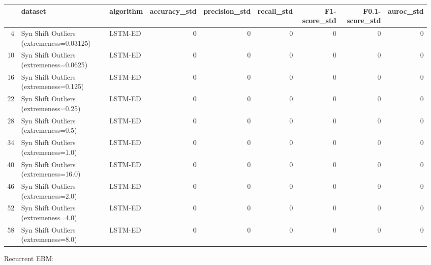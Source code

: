 \begin{tabular}{rllrrrrrr}
\hline
    & dataset                                  & algorithm   &   accuracy\_std &   precision\_std &   recall\_std &   F1-score\_std &   F0.1-score\_std &   auroc\_std \\
\hline
  4 & Syn Shift Outliers (extremeness=0.03125) & LSTM-ED     &              0 &               0 &            0 &              0 &                0 &           0 \\
 10 & Syn Shift Outliers (extremeness=0.0625)  & LSTM-ED     &              0 &               0 &            0 &              0 &                0 &           0 \\
 16 & Syn Shift Outliers (extremeness=0.125)   & LSTM-ED     &              0 &               0 &            0 &              0 &                0 &           0 \\
 22 & Syn Shift Outliers (extremeness=0.25)    & LSTM-ED     &              0 &               0 &            0 &              0 &                0 &           0 \\
 28 & Syn Shift Outliers (extremeness=0.5)     & LSTM-ED     &              0 &               0 &            0 &              0 &                0 &           0 \\
 34 & Syn Shift Outliers (extremeness=1.0)     & LSTM-ED     &              0 &               0 &            0 &              0 &                0 &           0 \\
 40 & Syn Shift Outliers (extremeness=16.0)    & LSTM-ED     &              0 &               0 &            0 &              0 &                0 &           0 \\
 46 & Syn Shift Outliers (extremeness=2.0)     & LSTM-ED     &              0 &               0 &            0 &              0 &                0 &           0 \\
 52 & Syn Shift Outliers (extremeness=4.0)     & LSTM-ED     &              0 &               0 &            0 &              0 &                0 &           0 \\
 58 & Syn Shift Outliers (extremeness=8.0)     & LSTM-ED     &              0 &               0 &            0 &              0 &                0 &           0 \\
\hline
\end{tabular}

Recurrent EBM:


